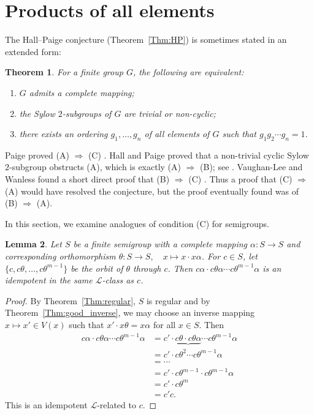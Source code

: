 \documentclass[11pt]{article}
\theoremstyle{plain}
\newtheorem{theorem}{Theorem}[section]
\newtheorem{lemma}[theorem]{Lemma}
\theoremstyle{remark}
\theoremstyle{definition}
\theoremstyle{plain}
\begin{document}
\section{Products of all elements}
\label{Sec:products}

The Hall--Paige conjecture (Theorem~\ref{Thm:HP}) is sometimes stated in an extended form:

\begin{theorem}\label{Thm:HPextended}
For a finite group $G$, the following are equivalent: 
\begin{enumerate}
\item[(A)] $G$ admits a complete mapping; 
\item[(B)] the Sylow $2$-subgroups of $G$ are trivial or non-cyclic;
\item[(C)] there exists an ordering $g_1,\ldots,g_n$ of all elements of $G$ such that $g_1 g_2 \cdots g_n = 1$.
\end{enumerate}
\end{theorem}

{\noindent Paige proved (A) $\Rightarrow$ (C) \cite[Theorem~1 and its corollary]{Paige}. Hall and Paige proved that a non-trivial cyclic Sylow $2$-subgroup obstructs (A), which is exactly (A) $\Rightarrow$ (B); see \cite[Theorem~5]{evans4}. Vaughan-Lee and Wanless found a short direct proof that (B) $\Rightarrow$ (C) \cite[Theorem~2.1]{VLW}. Thus a proof that (C) $\Rightarrow$ (A) would have resolved the conjecture, but the proof eventually found was of (B) $\Rightarrow$ (A).}

In this section, we examine analogues of condition (C) for semigroups.

\begin{lemma}\label{Lem:prod_idem}
Let $S$ be a finite semigroup with a complete mapping $\alpha\colon S\to S$ and corresponding orthomorphism
$\theta\colon S\to S,\quad x\mapsto x\cdot x\alpha$. For $c\in S$, let $\{c,c\theta,\ldots,c\theta^{m-1}\}$ be the orbit of $\theta$ through $c$. Then $c\alpha\cdot c\theta\alpha \cdots c\theta^{m-1}\alpha$ is an idempotent in the same $\mathcal{L}$-class as $c$.
\end{lemma}
\begin{proof}
By Theorem~\ref{Thm:regular}, $S$ is regular and by Theorem~\ref{Thm:good_inverse}, we may choose an inverse mapping $x\mapsto x'\in V(x)$ such that $x'\cdot x\theta = x\alpha$ for all $x\in S$. Then
\begin{align*}
c\alpha\cdot c\theta\alpha \cdots c\theta^{m-1}\alpha &= c'\cdot \underbrace{c\theta \cdot c\theta\alpha} \cdots c\theta^{m-1}\alpha \\
&= c'\cdot c\theta^2 \cdots c\theta^{m-1}\alpha \\
&= \cdots \\
&= c'\cdot c\theta^{m-1}\cdot c\theta^{m-1}\alpha \\
&= c'\cdot c\theta^m \\
&= c'c.
\end{align*}
This is an idempotent $\mathcal{L}$-related to $c$.
\end{proof}
\end{document}
